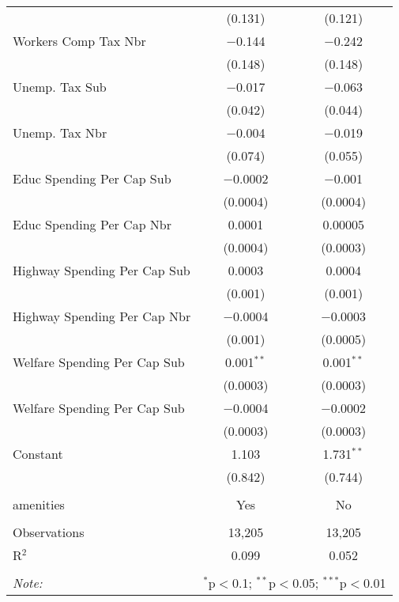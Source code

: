 \begin{table}[!htbp]
\begin{tabular}{@{\extracolsep{5pt}}lcc}
  & (0.131) & (0.121) \\ 
  Workers Comp Tax Nbr & $-$0.144 & $-$0.242 \\ 
  & (0.148) & (0.148) \\ 
  Unemp. Tax Sub & $-$0.017 & $-$0.063 \\ 
  & (0.042) & (0.044) \\ 
  Unemp. Tax Nbr & $-$0.004 & $-$0.019 \\ 
  & (0.074) & (0.055) \\ 
  Educ Spending Per Cap Sub & $-$0.0002 & $-$0.001 \\ 
  & (0.0004) & (0.0004) \\ 
  Educ Spending Per Cap Nbr & 0.0001 & 0.00005 \\ 
  & (0.0004) & (0.0003) \\ 
  Highway Spending Per Cap Sub & 0.0003 & 0.0004 \\ 
  & (0.001) & (0.001) \\ 
  Highway Spending Per Cap Nbr & $-$0.0004 & $-$0.0003 \\ 
  & (0.001) & (0.0005) \\ 
  Welfare Spending Per Cap Sub & 0.001$^{**}$ & 0.001$^{**}$ \\ 
  & (0.0003) & (0.0003) \\ 
  Welfare Spending Per Cap Sub & $-$0.0004 & $-$0.0002 \\ 
  & (0.0003) & (0.0003) \\ 
  Constant & 1.103 & 1.731$^{**}$ \\ 
  & (0.842) & (0.744) \\ 
 \hline \\[-1.8ex] 
amenities & Yes & No \\ 
\hline \\[-1.8ex] 
Observations & 13,205 & 13,205 \\ 
R$^{2}$ & 0.099 & 0.052 \\ 
\hline 
\hline \\[-1.8ex] 
\textit{Note:}  & \multicolumn{2}{r}{$^{*}$p$<$0.1; $^{**}$p$<$0.05; $^{***}$p$<$0.01} \\ 
\end{tabular} 
\end{table} 
